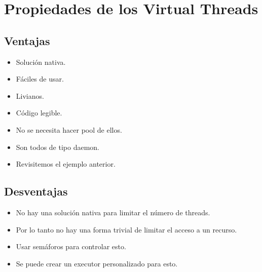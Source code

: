 \documentclass{presentacion}
\begin{document}
\section{Propiedades de los Virtual Threads}
\subsection{Ventajas}
\begin{frame}
 \begin{itemize}[<+->]
  \item Solución nativa.
  \item Fáciles de usar.
  \item Livianos.
  \item Código legible.
  \item No se necesita hacer pool de ellos.
  \item Son todos de tipo daemon.
  \item Revisitemos el ejemplo anterior.
 \end{itemize}

\end{frame}

\subsection{Desventajas}
\begin{frame}
 \begin{itemize}[<+->]
  \item No hay una solución nativa para limitar el número de threads.
  \item Por lo tanto no hay una forma trivial de limitar el acceso a un recurso.
  \item Usar semáforos para controlar esto.
  \item Se puede crear un executor personalizado para esto.
 \end{itemize}
\end{frame}
\end{document}
